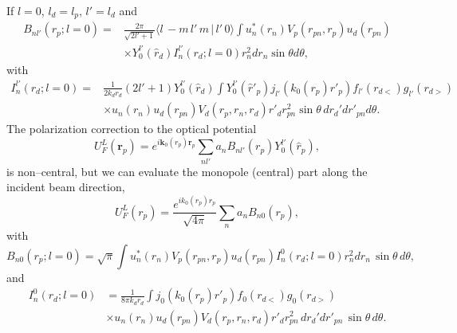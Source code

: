\documentclass[a4paper,11pt]{article}
\begin{document}
If $l=0$, $l_d=l_p$, $l'=l_d$ and
  \begin{align}\label{eq51}
  \nonumber B_{nl'}(r_p;l=0)=&\frac{2\pi}{\sqrt{2l'+1}}\langle l\,-m\,l'\,m\,|\,l'\,0\rangle\int u_n^*(r_n)V_p(r_{pn},r_p)u_d(r_{pn})\\
  &\times  Y^{l'}_0(\hat r_d) I^{l'}_n(r_d;l=0)r^2_n d r_n \sin\theta d\theta,
  \end{align}
  with
   \begin{align}\label{eq57}
  \nonumber I^{l'}_n(r_d;l=0)=&\frac{1}{2k_dr_d}(2l'+1)Y^{l'}_0(\hat r_d) \int  Y^{l'}_0(\hat r'_p)j_{l'}(k_0(r_p) r'_p)f_{l'}(r_{d<})g_{l'}(r_{d>})\\
  &\times u_n(r_n)u_d(r_{pn}) V_{d}(r_{p},r_n,r_d) r'_dr_{pn}^2\sin\theta\, d r_d'dr'_{pn}d\theta.
   \end{align}
The polarization correction to the optical potential 
 \begin{equation}\label{eq58}
U^L_F(\mathbf r_p)=e^{i\mathbf k_0(r_p)\mathbf r_p}\sum_{nl'} a_n B_{nl'}(r_p)Y_0^{l'}(\hat r_p),
 \end{equation}
is non--central, but we can evaluate the monopole (central) part  along the incident beam direction, 
 \begin{equation}\label{eq50}
U^L_F(r_p)=\frac{e^{i k_0(r_p)r_p}}{\sqrt{4\pi}}\sum_{n} a_n B_{n0}(r_p),
 \end{equation}
with
  \begin{equation}\label{eq59}
   B_{n0}(r_p;l=0)=\sqrt{\pi}\int u_n^*(r_n)V_p(r_{pn},r_p)u_d(r_{pn})   I^{0}_n(r_d;l=0)r^2_n d r_n\,\sin\theta\,d\theta,
  \end{equation}
and
   \begin{align}\label{eq60}
\nonumber I^{0}_n(r_d;l=0)&=\frac{1}{8\pi k_dr_d} \int j_{0}(k_0(r_p) r'_p)f_{0}(r_{d<})g_{0}(r_{d>})\\
 &\times u_n(r_n)u_d(r_{pn}) V_{d}(r_{p},r_n,r_d) r'_dr_{pn}^2\, d r_d'dr'_{pn}\,\sin\theta\,d\theta.
   \end{align}
\end{document}
